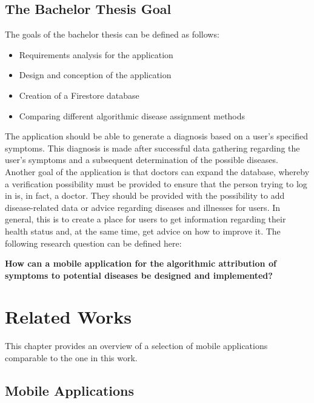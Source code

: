 \section{The Bachelor Thesis Goal}
The goals of the bachelor thesis can be defined as follows:
\begin{itemize}
	\item Requirements analysis for the application
	\item Design and conception of the application
	\item Creation of a Firestore database
	\item Comparing different algorithmic disease assignment methods
\end{itemize}
The application should be able to generate a diagnosis based on a user's specified symptoms. This diagnosis is made after successful data gathering regarding the user's symptoms and a subsequent determination of the possible diseases. Another goal of the application is that doctors can expand the database, whereby a verification possibility must be provided to ensure that the person trying to log in is, in fact, a doctor. They should be provided with the possibility to add disease-related data or advice regarding diseases and illnesses for users. In general, this is to create a place for users to get information regarding their health status and, at the same time, get advice on how to improve it. The following research question can be defined here:
\newline \\
\begin{center}
	\textbf{How can a mobile application for the algorithmic attribution of symptoms to potential diseases be designed and implemented?}
\end{center}

\chapter{Related Works}
This chapter provides an overview of a selection of mobile applications comparable to the one in this work.

\section{Mobile Applications}
